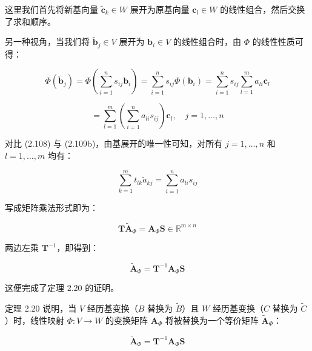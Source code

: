 这里我们首先将新基向量 $ \tilde{\boldsymbol{c}}_k \in W $ 展开为原基向量 $ \boldsymbol{c}_l \in W $ 的线性组合，然后交换了求和顺序。

另一种视角，当我们将 $ \tilde{\boldsymbol{b}}_j \in V $ 展开为 $ \boldsymbol{b}_i \in V $ 的线性组合时，由 $ \Phi $ 的线性性质可得：

\begin{equation}
\Phi(\tilde{\boldsymbol{b}}_j) = \Phi\left( \sum_{i=1}^n s_{ij}\boldsymbol{b}_i \right) = \sum_{i=1}^n s_{ij} \Phi(\boldsymbol{b}_i) = \sum_{i=1}^n s_{ij} \sum_{l=1}^m a_{li}\boldsymbol{c}_l
\tag{2.109a}\label{eq:2-109a}
\end{equation}

\begin{equation}
= \sum_{l=1}^m \left( \sum_{i=1}^n a_{li}s_{ij} \right) \boldsymbol{c}_l, \quad j = 1, \ldots, n
\tag{2.109b}\label{eq:2-109b}
\end{equation}

对比 (2.108) 与 (2.109b)，由基展开的唯一性可知，对所有 $ j = 1, \ldots, n $ 和 $ l = 1, \ldots, m $ 均有：

\begin{equation}
\sum_{k=1}^m t_{lk} \tilde{a}_{kj} = \sum_{i=1}^n a_{li} s_{ij}
\tag{2.110}\label{eq:2-110}
\end{equation}

写成矩阵乘法形式即为：

\begin{equation}
\boldsymbol{T} \tilde{\boldsymbol{A}}_\Phi = \boldsymbol{A}_\Phi \boldsymbol{S} \in \mathbb{R}^{m \times n}
\tag{2.111}\label{eq:2-111}
\end{equation}

两边左乘 $ \boldsymbol{T}^{-1} $，即得到：

\begin{equation}
\tilde{\boldsymbol{A}}_\Phi = \boldsymbol{T}^{-1} \boldsymbol{A}_\Phi \boldsymbol{S}
\tag{2.112}\label{eq:2-112}
\end{equation}

这便完成了定理 2.20 的证明。

定理 2.20 说明，当 $ V $ 经历基变换（$ B $ 替换为 $ \tilde{B} $）且 $ W $ 经历基变换（$ C $ 替换为 $ \tilde{C} $）时，线性映射 $ \Phi : V \to W $ 的变换矩阵 $ \boldsymbol{A}_\Phi $ 将被替换为一个等价矩阵 $ \tilde{\boldsymbol{A}}_\Phi $：

\begin{equation}
\tilde{\boldsymbol{A}}_\Phi = \boldsymbol{T}^{-1} \boldsymbol{A}_\Phi \boldsymbol{S}
\tag{2.113}\label{eq:2-113}
\end{equation}

